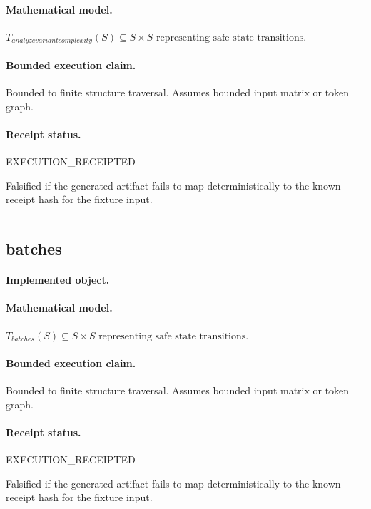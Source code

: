 \paragraph{Mathematical model.} $T_{analyzevariantcomplexity}(S) \subseteq S \times S \text{ representing safe state transitions}.$
\paragraph{Bounded execution claim.} Bounded to finite structure traversal. Assumes bounded input matrix or token graph.
\paragraph{Receipt status.} EXECUTION\_RECEIPTED
\begin{falsifier}
Falsified if the generated artifact fails to map deterministically to the known receipt hash for the fixture input.
\end{falsifier}

\vspace{1em}\hrule\vspace{1em}
\subsection{batches}
\paragraph{Implemented object.} 
\paragraph{Mathematical model.} $T_{batches}(S) \subseteq S \times S \text{ representing safe state transitions}.$
\paragraph{Bounded execution claim.} Bounded to finite structure traversal. Assumes bounded input matrix or token graph.
\paragraph{Receipt status.} EXECUTION\_RECEIPTED
\begin{falsifier}
Falsified if the generated artifact fails to map deterministically to the known receipt hash for the fixture input.
\end{falsifier}

